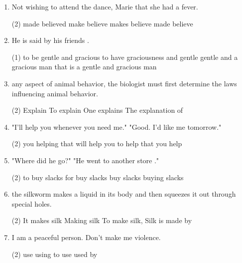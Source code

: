 \begin{enumerate}
\item Not wishing to attend the dance, Marie \ttu that she had a fever.
  \begin{tasks}(2)
    \task made believed
    \task make believe
    \task makes believe
    \task made believe
  \end{tasks}

\item He is said by his friends \ttu.
  \begin{tasks}(1)
    \task to be gentle and gracious
    \task to have graciousness and gentle
    \task gentle and a gracious man
    \task that is a gentle and gracious man
  \end{tasks}

\item \ttu any aspect of animal behavior, the biologist must first determine
the laws influencing animal behavior.
  \begin{tasks}(2)
    \task Explain
    \task To explain
    \task One explains
    \task The explanation of
  \end{tasks}

\item "I'll help you whenever you need me." "Good. I'd like \ttu me tomorrow."
  \begin{tasks}(2)
    \task you helping
    \task that will help
    \task you to help
    \task that you help
  \end{tasks}

\item "Where did he go?" "He went to another store \ttu ."
  \begin{tasks}(2)
    \task to buy slacks
    \task for buy slacks
    \task buy slacks
    \task buying slacks
  \end{tasks}

\item \ttu the silkworm makes a liquid in its body and then squeezes it out through special holes.
  \begin{tasks}(2)
    \task It makes silk
    \task Making silk
    \task To make silk,
    \task Silk is made by
  \end{tasks}

\item I am a peaceful person. Don't make me \ttu violence.
  \begin{tasks}(2)
    \task use
    \task using
    \task to use
    \task used by
  \end{tasks}


\end{enumerate}
